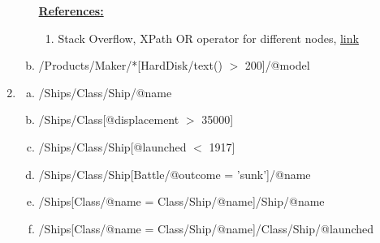 \documentclass[12pt]{article}
\begin{document}
\begin{enumerate}[1.]
\begin{enumerate}[a)]
        \bigskip

        \underline{\textbf{References:}}

        \bigskip

        \begin{enumerate}[1)]
            \item Stack Overflow, XPath OR operator for different nodes, \href{https://stackoverflow.com/questions/5350666/xpath-or-operator-for-different-nodes}{link}
        \end{enumerate}

        \item /Products/Maker/*[HardDisk/text() $>$ 200]/@model
    \end{enumerate}

    \item

    \begin{enumerate}[a)]
        \item /Ships/Class/Ship/@name
        \item /Ships/Class[@displacement $>$ 35000]
        \item /Ships/Class/Ship[@launched $<$ 1917]
        \item /Ships/Class/Ship[Battle/@outcome = 'sunk']/@name
        \item /Ships[Class/@name = Class/Ship/@name]/Ship/@name
        \item /Ships[Class/@name = Class/Ship/@name]/Class/Ship/@launched
    \end{enumerate}
\end{enumerate}
\end{document}
